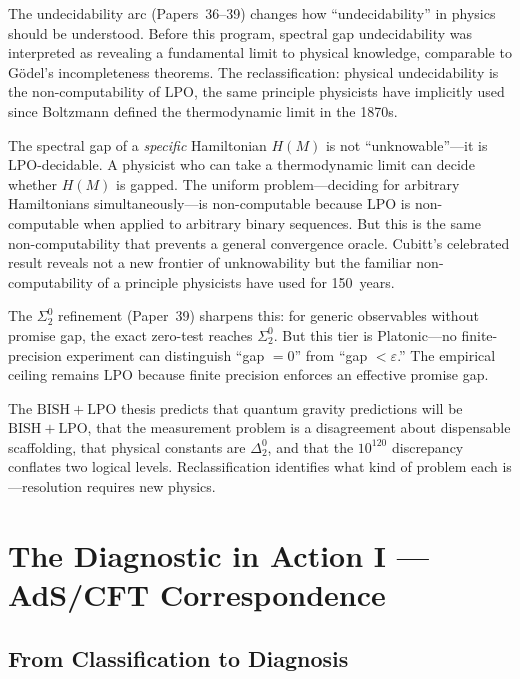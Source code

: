 \documentclass[11pt,a4paper]{report}
\theoremstyle{plain}
\theoremstyle{definition}
\theoremstyle{remark}
\newcommand{\BISH}{\mathrm{BISH}}
\newcommand{\LPO}{\mathrm{LPO}}
\begin{document}
The undecidability arc (Papers~36--39) changes how ``undecidability'' in physics should be understood. Before this program, spectral gap undecidability was interpreted as revealing a fundamental limit to physical knowledge, comparable to G\"odel's incompleteness theorems. The reclassification: physical undecidability is the non-computability of $\LPO$, the same principle physicists have implicitly used since Boltzmann defined the thermodynamic limit in the 1870s.

The spectral gap of a \emph{specific} Hamiltonian $H(M)$ is not ``unknowable''---it is $\LPO$-decidable. A physicist who can take a thermodynamic limit can decide whether $H(M)$ is gapped. The uniform problem---deciding for arbitrary Hamiltonians simultaneously---is non-computable because $\LPO$ is non-computable when applied to arbitrary binary sequences. But this is the same non-computability that prevents a general convergence oracle. Cubitt's celebrated result reveals not a new frontier of unknowability but the familiar non-computability of a principle physicists have used for 150~years.

The $\Sigma^0_2$ refinement (Paper~39) sharpens this: for generic observables without promise gap, the exact zero-test reaches $\Sigma^0_2$. But this tier is Platonic---no finite-precision experiment can distinguish ``gap $= 0$'' from ``gap $< \varepsilon$.'' The empirical ceiling remains $\LPO$ because finite precision enforces an effective promise gap.

\begin{chapterbox}
The $\BISH+\LPO$ thesis predicts that quantum gravity predictions will be $\BISH+\LPO$, that the measurement problem is a disagreement about dispensable scaffolding, that physical constants are $\Delta^0_2$, and that the $10^{120}$ discrepancy conflates two logical levels. Reclassification identifies what kind of problem each is---resolution requires new physics.
\end{chapterbox}

\chapter{The Diagnostic in Action I --- AdS/CFT Correspondence}

\section{From Classification to Diagnosis}
\end{document}
